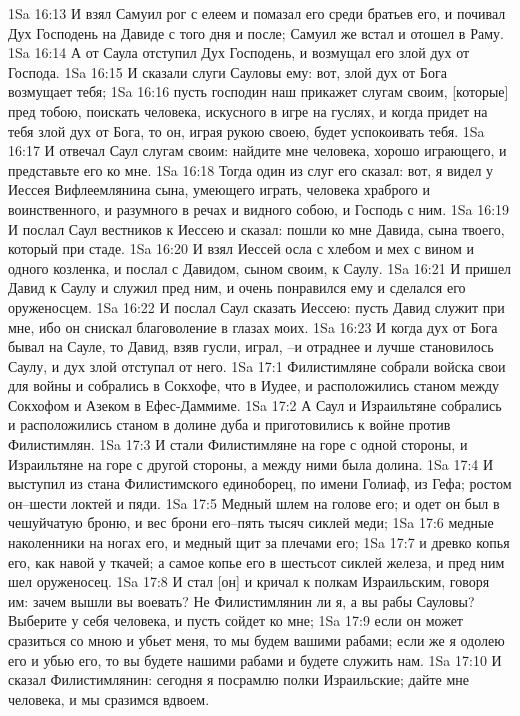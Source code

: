 1Sa 16:13  И взял Самуил рог с елеем и помазал его среди братьев его, и почивал Дух Господень на Давиде с того дня и после; Самуил же встал и отошел в Раму.
1Sa 16:14  А от Саула отступил Дух Господень, и возмущал его злой дух от Господа.
1Sa 16:15  И сказали слуги Сауловы ему: вот, злой дух от Бога возмущает тебя;
1Sa 16:16  пусть господин наш прикажет слугам своим, [которые] пред тобою, поискать человека, искусного в игре на гуслях, и когда придет на тебя злой дух от Бога, то он, играя рукою своею, будет успокоивать тебя.
1Sa 16:17  И отвечал Саул слугам своим: найдите мне человека, хорошо играющего, и представьте его ко мне.
1Sa 16:18  Тогда один из слуг его сказал: вот, я видел у Иессея Вифлеемлянина сына, умеющего играть, человека храброго и воинственного, и разумного в речах и видного собою, и Господь с ним.
1Sa 16:19  И послал Саул вестников к Иессею и сказал: пошли ко мне Давида, сына твоего, который при стаде.
1Sa 16:20  И взял Иессей осла с хлебом и мех с вином и одного козленка, и послал с Давидом, сыном своим, к Саулу.
1Sa 16:21  И пришел Давид к Саулу и служил пред ним, и очень понравился ему и сделался его оруженосцем.
1Sa 16:22  И послал Саул сказать Иессею: пусть Давид служит при мне, ибо он снискал благоволение в глазах моих.
1Sa 16:23  И когда дух от Бога бывал на Сауле, то Давид, взяв гусли, играл, --и отраднее и лучше становилось Саулу, и дух злой отступал от него.
1Sa 17:1  Филистимляне собрали войска свои для войны и собрались в Сокхофе, что в Иудее, и расположились станом между Сокхофом и Азеком в Ефес-Даммиме.
1Sa 17:2  А Саул и Израильтяне собрались и расположились станом в долине дуба и приготовились к войне против Филистимлян.
1Sa 17:3  И стали Филистимляне на горе с одной стороны, и Израильтяне на горе с другой стороны, а между ними была долина.
1Sa 17:4  И выступил из стана Филистимского единоборец, по имени Голиаф, из Гефа; ростом он--шести локтей и пяди.
1Sa 17:5  Медный шлем на голове его; и одет он был в чешуйчатую броню, и вес брони его--пять тысяч сиклей меди;
1Sa 17:6  медные наколенники на ногах его, и медный щит за плечами его;
1Sa 17:7  и древко копья его, как навой у ткачей; а самое копье его в шестьсот сиклей железа, и пред ним шел оруженосец.
1Sa 17:8  И стал [он] и кричал к полкам Израильским, говоря им: зачем вышли вы воевать? Не Филистимлянин ли я, а вы рабы Сауловы? Выберите у себя человека, и пусть сойдет ко мне;
1Sa 17:9  если он может сразиться со мною и убьет меня, то мы будем вашими рабами; если же я одолею его и убью его, то вы будете нашими рабами и будете служить нам.
1Sa 17:10  И сказал Филистимлянин: сегодня я посрамлю полки Израильские; дайте мне человека, и мы сразимся вдвоем.
